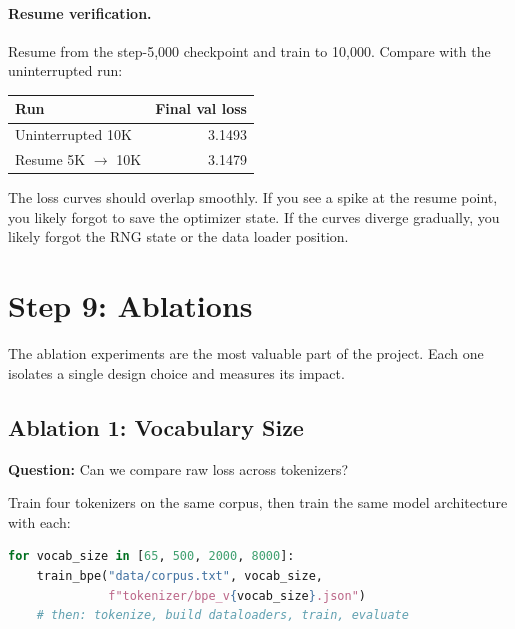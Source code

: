 \paragraph{Resume verification.}

Resume from the step-5{,}000 checkpoint and train to 10{,}000.
Compare with the uninterrupted run:

\begin{center}
\begin{tabular}{lr}
\toprule
Run & Final val loss \\
\midrule
Uninterrupted 10K & 3.1493 \\
Resume 5K $\to$ 10K & 3.1479 \\
\bottomrule
\end{tabular}
\end{center}

The loss curves should overlap smoothly.
If you see a spike at the resume point, you likely forgot to save the optimizer state.
If the curves diverge gradually, you likely forgot the RNG state or the data loader position.


\section{Step 9: Ablations}
\label{sec:guide-ablation}

The ablation experiments are the most valuable part of the project.
Each one isolates a single design choice and measures its impact.

\subsection{Ablation 1: Vocabulary Size}

\textbf{Question:} Can we compare raw loss across tokenizers?

Train four tokenizers on the same corpus, then train the same model architecture with each:

\begin{lstlisting}[language=python, caption={Vocab sweep setup}]
for vocab_size in [65, 500, 2000, 8000]:
    train_bpe("data/corpus.txt", vocab_size,
              f"tokenizer/bpe_v{vocab_size}.json")
    # then: tokenize, build dataloaders, train, evaluate
\end{lstlisting}


